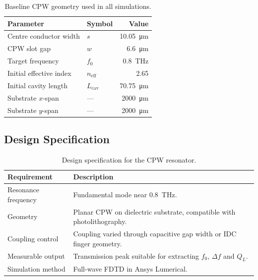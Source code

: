 \documentclass[12pt,a4paper]{article}
\begin{document}
\begin{table}[htbp]
    \centering
    \caption{Baseline CPW geometry used in all simulations.}
    \label{tab:baseline_geometry}
    \begin{tabular}{llr}
        \toprule
        Parameter & Symbol & Value \\
        \midrule
        Centre conductor width   & $s$               & \SI{10.05}{\micro\metre} \\
        CPW slot gap             & $w$               & \SI{6.6}{\micro\metre}   \\
        Target frequency         & $f_0$             & \SI{0.8}{\tera\hertz}    \\
        Initial effective index  & $n_{\mathrm{eff}}$& 2.65                     \\
        Initial cavity length    & $L_{\mathrm{cav}}$& \SI{70.75}{\micro\metre} \\
        Substrate $x$-span       & ---               & \SI{2000}{\micro\metre}  \\
        Substrate $y$-span       & ---               & \SI{2000}{\micro\metre}  \\
        \bottomrule
    \end{tabular}
\end{table}

\subsection{Design Specification}

\begin{table}[htbp]
    \centering
    \caption{Design specification for the CPW resonator.}
    \label{tab:specification}
    \begin{tabularx}{\textwidth}{lX}
        \toprule
        Requirement & Description \\
        \midrule
        Resonance frequency & Fundamental mode near \SI{0.8}{\tera\hertz}. \\
        Geometry & Planar CPW on dielectric substrate, compatible with photolithography. \\
        Coupling control & Coupling varied through capacitive gap width or IDC finger geometry. \\
        Measurable output & Transmission peak suitable for extracting $f_0$, $\Delta f$ and $Q_L$. \\
        Simulation method & Full-wave FDTD in Ansys Lumerical. \\
        \bottomrule
    \end{tabularx}
\end{table}
\end{document}
